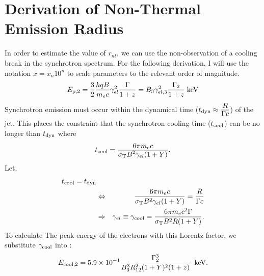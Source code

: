 \chapter{Derivation of Non-Thermal Emission Radius}
\label{ch:rnt}

In order to estimate the value of $r_{nt}$, we can use the non-observation of a cooling break in the synchrotron spectrum. For the following derivation, I will use the notation $x = x_n 10^n$ to scale parameters to the relevant order of magnitude.
\begin{equation}
  \label{eq:epsyder}
  E_{\rm p,2}=\frac{3}{2}\frac{hqB}{m_e c}\gamma_{el}^2\frac{\Gamma}{1+z}=  B_3\gamma_{el,3}^2\frac{\Gamma_2}{1+z}\; {\rm keV}
\end{equation}
Synchrotron emission must occur within the dynamical time ($t_{\rm dyn} \approx \dover{R}{\Gamma c}$) of the jet. This places the
constraint that the synchrotron cooling time ($t_{\rm cool}$) can be
no longer than $t_{\rm dyn}$ where
\begin{equation}
  \label{eq:cooltime}
  t_{\rm cool} = \dover{6 \pi m_e c}{\sigma_{\rm T} B^2 \gamma_{el} (1+Y)}.
\end{equation}
Let, 
\begin{eqnarray}
  \label{eq:derv2}
 t_{\rm cool}=t_{\rm dyn} & &\\
  &\Leftrightarrow & \frac{6 \pi m_e c}{\sigma_{\rm T} B^2 \gamma_{el} (1+Y)} =  \frac{R}{\Gamma c}\\
&\Rightarrow & \gamma_{el}\equiv \gamma_{\rm cool}= \frac{6 \pi m_e c^2 \Gamma}{\sigma_{\rm T}B^2 R (1+Y)  }.
\end{eqnarray}
To calculate The peak energy of the electrons with this Lorentz factor, we substitute $\gamma_{\rm cool}$ into :
\begin{equation}
  \label{eq:ecoolderv}
  E_{\rm cool,2} = 5.9 \times 10^{-1} \frac{\Gamma_2^3}{B_3^3 R_{12}^2 (1+Y)^2 (1+z)} \;\;{\rm keV}.
\end{equation}


